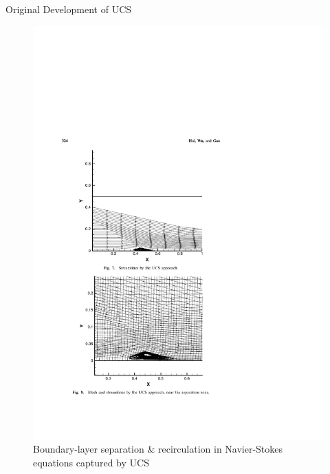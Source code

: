 \documentclass{beamer}
\begin{document}
\begin{frame}{Original Development of UCS}
  \begin{figure}
    \includegraphics[height=.7\textheight]{ViscousRecirculationStreamsHui.pdf}
    \caption{Boundary-layer separation \& recirculation in
      Navier-Stokes equations captured by UCS\cite{huiviscous07}}
  \end{figure}
\end{frame}
\end{document}
